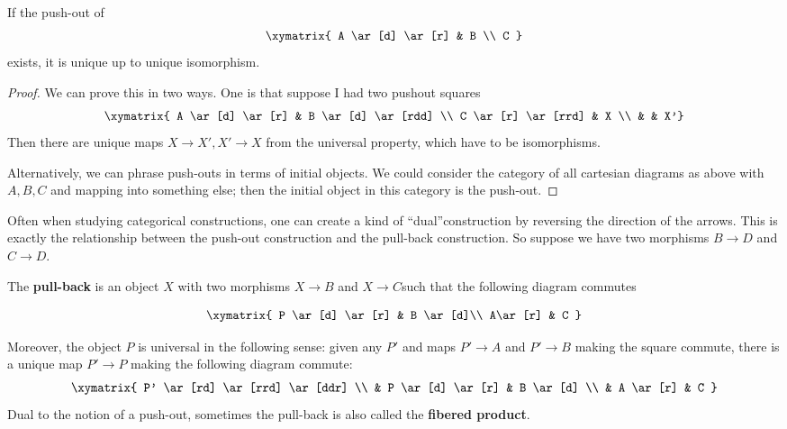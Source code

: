 \begin{proposition}
If the push-out of
\[ \xymatrix{
A \ar[d] \ar[r] & B \\
C
}\]
exists, it is unique up to unique isomorphism.
\end{proposition}
\begin{proof}
We can prove this in two ways. One is that suppose I had two pushout squares
\[
\xymatrix{
A \ar[d] \ar[r] &  B \ar[d] \ar[rdd] \\
C \ar[r] \ar[rrd] &  X \\
& & X'}
\]
Then there are unique maps $X \to X', X' \to X$ from the universal property,
which have to be isomorphisms.

Alternatively, we can phrase push-outs in terms of initial objects. We could
consider the category of all cartesian diagrams as above with $A,B,C$ and
mapping into something else; then the initial
object in this category is the push-out.
\end{proof}

Often when studying categorical constructions, one can create a kind of
``dual''construction by reversing the direction of the arrows. This is exactly
the
relationship between the push-out construction and the pull-back construction.
So suppose we have two morphisms $B \to D$ and $C\to D$.
\begin{definition}
The \textbf{pull-back} is an object $X$ with two morphisms $X\to B$ and $X\to
C$such that the following diagram commutes

\[ \xymatrix {
P \ar[d] \ar[r] & B \ar[d]\\
A\ar[r] & C }\]

Moreover, the object $P$ is universal in the following sense: given any $P'$
and maps $P'\to A$ and $P'\to B$ making the square commute, there is a
unique map
$P'\to P$ making the following diagram commute:
\[
\xymatrix{
 P' \ar[rd] \ar[rrd] \ar[ddr] \\
& P \ar[d] \ar[r] &  B \ar[d] \\
& A \ar[r] &  C }\]
Dual to the notion of a push-out, sometimes the pull-back is also called the
\textbf{fibered product}.
\end{definition}

